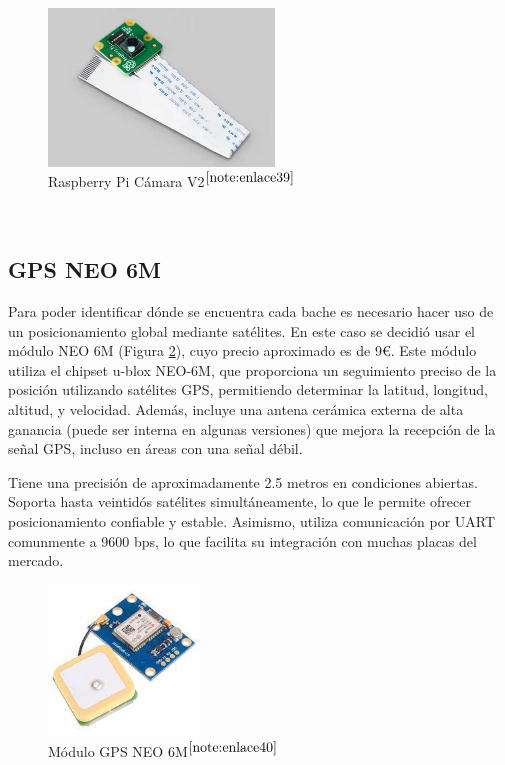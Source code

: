 \begin{figure} [h!]
	\begin{center}
		\includegraphics[width=6cm]{figs/campi.png}
	\end{center}
	\caption{Raspberry Pi Cámara V2$^{\ref{note:enlace39}}$} 
\label{fig:raspberrycam}
\end{figure}\

\setcounter{footnote}{39} %

\subsection{GPS NEO 6M}

Para poder identificar dónde se encuentra cada bache es necesario hacer uso de un posicionamiento global mediante satélites. En este caso se decidió usar el módulo NEO 6M (Figura \ref{fig:gps}), cuyo precio aproximado es de 9€. Este módulo utiliza el chipset u-blox NEO-6M, que proporciona un seguimiento preciso de la posición utilizando satélites \acs{GPS}, permitiendo determinar la latitud, longitud, altitud, y velocidad. Además, incluye una antena cerámica externa de alta ganancia (puede ser interna en algunas versiones) que mejora la recepción de la señal \acs{GPS}, incluso en áreas con una señal débil.

Tiene una precisión de aproximadamente 2.5 metros en condiciones abiertas. Soporta hasta veintidós satélites simultáneamente, lo que le permite ofrecer posicionamiento confiable y estable. Asimismo, utiliza comunicación por \ac{UART} comunmente a 9600 bps, lo que facilita su integración con muchas placas del mercado.

\begin{figure} [h!]
	\begin{center}
		\includegraphics[width=4cm]{figs/GPSNEO6MV2.jpeg}
	\end{center}
	\caption{Módulo GPS NEO 6M$^{\ref{note:enlace40}}$} 
\label{fig:gps}
\end{figure}\

